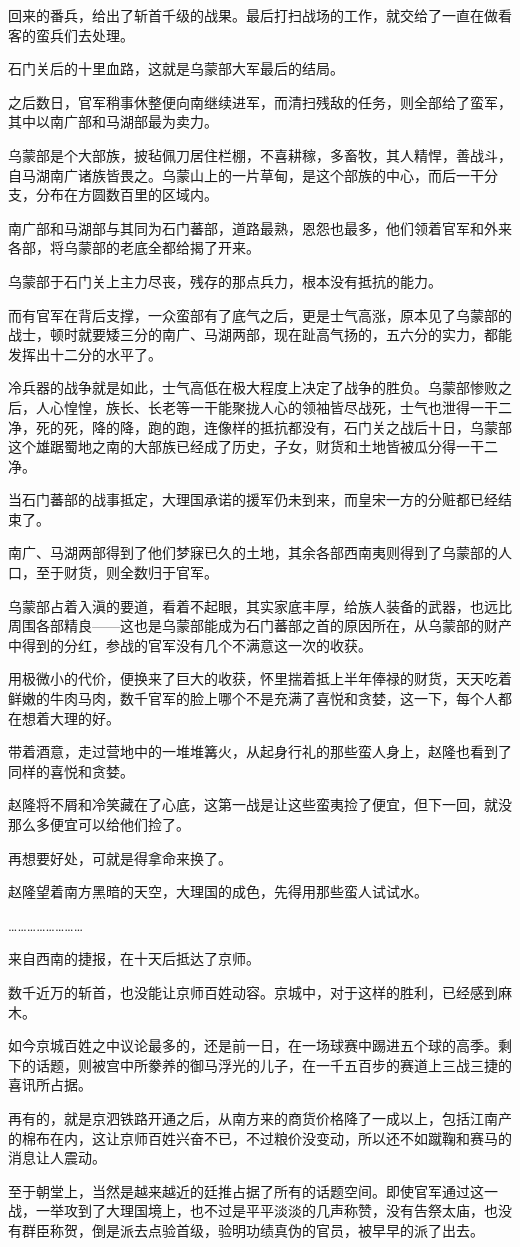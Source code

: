 回来的番兵，给出了斩首千级的战果。最后打扫战场的工作，就交给了一直在做看客的蛮兵们去处理。

石门关后的十里血路，这就是乌蒙部大军最后的结局。

之后数日，官军稍事休整便向南继续进军，而清扫残敌的任务，则全部给了蛮军，其中以南广部和马湖部最为卖力。

乌蒙部是个大部族，披毡佩刀居住栏棚，不喜耕稼，多畜牧，其人精悍，善战斗，自马湖南广诸族皆畏之。乌蒙山上的一片草甸，是这个部族的中心，而后一干分支，分布在方圆数百里的区域内。

南广部和马湖部与其同为石门蕃部，道路最熟，恩怨也最多，他们领着官军和外来各部，将乌蒙部的老底全都给揭了开来。

乌蒙部于石门关上主力尽丧，残存的那点兵力，根本没有抵抗的能力。

而有官军在背后支撑，一众蛮部有了底气之后，更是士气高涨，原本见了乌蒙部的战士，顿时就要矮三分的南广、马湖两部，现在趾高气扬的，五六分的实力，都能发挥出十二分的水平了。

冷兵器的战争就是如此，士气高低在极大程度上决定了战争的胜负。乌蒙部惨败之后，人心惶惶，族长、长老等一干能聚拢人心的领袖皆尽战死，士气也泄得一干二净，死的死，降的降，跑的跑，连像样的抵抗都没有，石门关之战后十日，乌蒙部这个雄踞蜀地之南的大部族已经成了历史，子女，财货和土地皆被瓜分得一干二净。

当石门蕃部的战事抵定，大理国承诺的援军仍未到来，而皇宋一方的分赃都已经结束了。

南广、马湖两部得到了他们梦寐已久的土地，其余各部西南夷则得到了乌蒙部的人口，至于财货，则全数归于官军。

乌蒙部占着入滇的要道，看着不起眼，其实家底丰厚，给族人装备的武器，也远比周围各部精良——这也是乌蒙部能成为石门蕃部之首的原因所在，从乌蒙部的财产中得到的分红，参战的官军没有几个不满意这一次的收获。

用极微小的代价，便换来了巨大的收获，怀里揣着抵上半年俸禄的财货，天天吃着鲜嫩的牛肉马肉，数千官军的脸上哪个不是充满了喜悦和贪婪，这一下，每个人都在想着大理的好。

带着酒意，走过营地中的一堆堆篝火，从起身行礼的那些蛮人身上，赵隆也看到了同样的喜悦和贪婪。

赵隆将不屑和冷笑藏在了心底，这第一战是让这些蛮夷捡了便宜，但下一回，就没那么多便宜可以给他们捡了。

再想要好处，可就是得拿命来换了。

赵隆望着南方黑暗的天空，大理国的成色，先得用那些蛮人试试水。

……………………

来自西南的捷报，在十天后抵达了京师。

数千近万的斩首，也没能让京师百姓动容。京城中，对于这样的胜利，已经感到麻木。

如今京城百姓之中议论最多的，还是前一日，在一场球赛中踢进五个球的高季。剩下的话题，则被宫中所豢养的御马浮光的儿子，在一千五百步的赛道上三战三捷的喜讯所占据。

再有的，就是京泗铁路开通之后，从南方来的商货价格降了一成以上，包括江南产的棉布在内，这让京师百姓兴奋不已，不过粮价没变动，所以还不如蹴鞠和赛马的消息让人震动。

至于朝堂上，当然是越来越近的廷推占据了所有的话题空间。即使官军通过这一战，一举攻到了大理国境上，也不过是平平淡淡的几声称赞，没有告祭太庙，也没有群臣称贺，倒是派去点验首级，验明功绩真伪的官员，被早早的派了出去。
